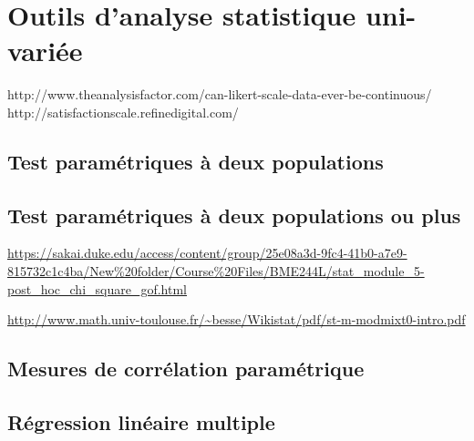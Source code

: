 \chapter{Outils d'analyse statistique uni-variée}
\label{app:statuni}

http://www.theanalysisfactor.com/can-likert-scale-data-ever-be-continuous/ \\
http://satisfactionscale.refinedigital.com/
\section{Test paramétriques à deux populations}
\label{app:student}

\section{Test paramétriques à deux populations ou plus}
\label{app:anova}

\url{https://sakai.duke.edu/access/content/group/25e08a3d-9fc4-41b0-a7e9-815732c1c4ba/New\%20folder/Course\%20Files/BME244L/stat_module_5-post_hoc_chi_square_gof.html}

\url{http://www.math.univ-toulouse.fr/~besse/Wikistat/pdf/st-m-modmixt0-intro.pdf}

\section{Mesures de corrélation paramétrique}
\label{app:corr}

\section{Régression linéaire multiple}
\label{app:regressionMultiple}
